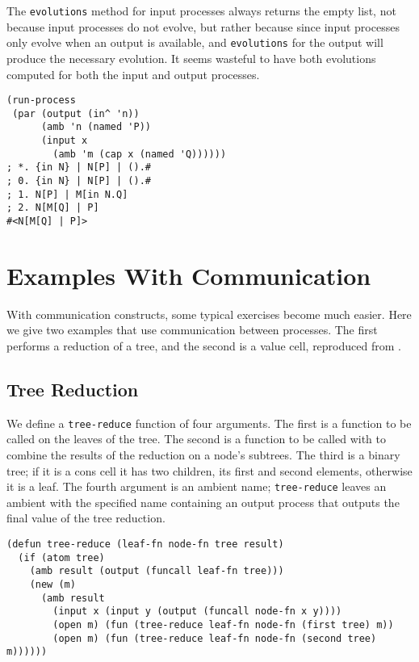 \documentclass[12pt]{article}
\begin{document}
The \texttt{evolutions} method for input processes always returns the empty list, not because input processes do not evolve, but rather because since input processes only evolve when an output is available, and \texttt{evolutions} for the output will produce the necessary evolution.
It seems wasteful to have both evolutions computed for both the input and output processes.

\begin{verbatim}
(run-process
 (par (output (in^ 'n))
      (amb 'n (named 'P))
      (input x
        (amb 'm (cap x (named 'Q))))))
; *. {in N} | N[P] | ().#
; 0. {in N} | N[P] | ().#
; 1. N[P] | M[in N.Q]
; 2. N[M[Q] | P]
#<N[M[Q] | P]>
\end{verbatim}

\section{Examples With Communication}
\label{sec:examples-with-communication}

With communication constructs, some typical exercises become much easier.
Here we give two examples that use communication between processes.
The first performs a reduction of a tree, and the second is a value cell, reproduced from .

\subsection{Tree Reduction}
\label{sec:tree-reduction}

We define a \texttt{tree-reduce} function of four arguments.
The first is a function to be called on the leaves of the tree.
The second is a function to be called with to combine the results of the reduction on a node's subtrees.
The third is a binary tree;  if it is a cons cell it has two children, its first and second elements, otherwise it is a leaf.
The fourth argument is an ambient name;  \texttt{tree-reduce} leaves an ambient with the specified name containing an output process that outputs the final value of the tree reduction.

\begin{verbatim}
(defun tree-reduce (leaf-fn node-fn tree result)
  (if (atom tree)
    (amb result (output (funcall leaf-fn tree)))
    (new (m)
      (amb result
        (input x (input y (output (funcall node-fn x y))))
        (open m) (fun (tree-reduce leaf-fn node-fn (first tree) m))
        (open m) (fun (tree-reduce leaf-fn node-fn (second tree) m))))))
\end{verbatim}
\end{document}
